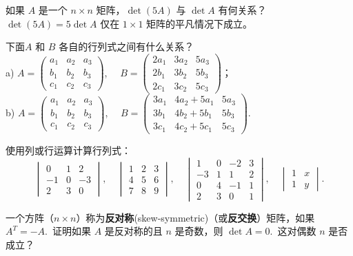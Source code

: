 \begin{problemset}
\item \label{ex:03-03-01} 如果 $A$ 是一个 $n \times n$ 矩阵，$\det(5A)$ 与 $\det A$ 有何关系？\\
$\det(5A) = 5 \det A$ 仅在 $1 \times 1$ 矩阵的平凡情况下成立。
\item \label{ex:03-03-02} 下面$A$ 和 $B$ 各自的行列式之间有什么关系？
\\
a) $A = \begin{pmatrix} a_1 & a_2 & a_3 \\ b_1 & b_2 & b_3 \\ c_1 & c_2 & c_3 \end{pmatrix}$, $\quad B = \begin{pmatrix} 2a_1 & 3a_2 & 5a_3 \\ 2b_1 & 3b_2 & 5b_3 \\ 2c_1 & 3c_2 & 5c_3 \end{pmatrix}$；
\\
b) $A = \begin{pmatrix} a_1 & a_2 & a_3 \\ b_1 & b_2 & b_3 \\ c_1 & c_2 & c_3 \end{pmatrix}$, $\quad B = \begin{pmatrix} 3a_1 & 4a_2 + 5a_1 & 5a_3 \\ 3b_1 & 4b_2 + 5b_1 & 5b_3 \\ 3c_1 & 4c_2 + 5c_1 & 5c_3 \end{pmatrix}$.
\item \label{ex:03-03-03} 使用列或行运算计算行列式：
$$\begin{vmatrix} 0 & 1 & 2 \\ -1 & 0 & -3 \\ 2 & 3 & 0 \end{vmatrix},\quad \begin{vmatrix} 1 & 2 & 3 \\ 4 & 5 & 6 \\ 7 & 8 & 9 \end{vmatrix},\quad \begin{vmatrix} 1 & 0 & -2 & 3 \\ -3 & 1 & 1 & 2 \\ 0 & 4 & -1 & 1 \\ 2 & 3 & 0 & 1 \end{vmatrix},\quad \begin{vmatrix} 1 & x \\ 1 & y \end{vmatrix}.$$
\item \label{ex:03-03-04} 一个方阵（$n \times n$）称为\textbf{反对称}(skew-symmetric)（或\textbf{反交换}）矩阵，如果 $A^T = -A$.~证明如果 $A$ 是反对称的且 $n$ 是奇数，则 $\det A = 0$.~这对偶数 $n$ 是否成立？

\end{problemset}
